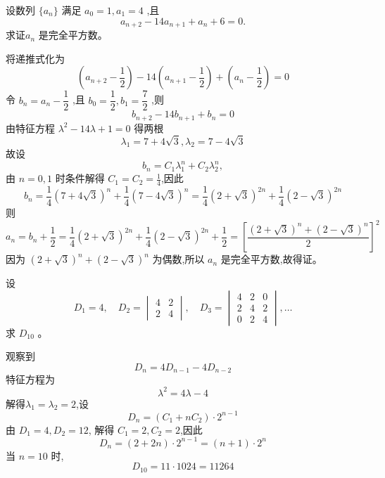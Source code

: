 \begin{questions}
    \question 设数列 $\{a_n\}$ 满足 $a_0 = 1, a_1 = 4$ ,且 
    \[
    a_{n+2} - 14a_{n+1} + a_n + 6 = 0.
    \]
    求证$a_n$ 是完全平方数。
    \begin{solution}
        将递推式化为 
        \[
        \left(a_{n+2} - \frac{1}{2}\right) - 14\left(a_{n+1} - \frac{1}{2}\right) + \left(a_n - \frac{1}{2}\right) = 0
        \]
        令 $b_n = a_n - \dfrac{1}{2}$ ,且 $b_0 = \dfrac{1}{2}, b_1 = \dfrac{7}{2}$ ,则 
        \[
        b_{n+2} - 14b_{n+1} + b_n = 0
        \]
        由特征方程 $\lambda^2 - 14\lambda + 1 = 0$ 得两根 
        \[
        \lambda_1 = 7+4\sqrt{3}, \lambda_2 = 7-4\sqrt{3}
        \]
        故设
        \[
        b_n = C_1 \lambda_1^n + C_2 \lambda_2^n ,
        \]
        由 $n=0, 1$ 时条件解得 $C_1 = C_2 = \frac{1}{4}$,因此 
        \[
        b_n = \frac{1}{4}(7+4\sqrt{3})^n + \frac{1}{4}(7-4\sqrt{3})^n = \frac{1}{4}(2+\sqrt{3})^{2n} + \frac{1}{4}(2-\sqrt{3})^{2n}
        \]
        则 
        \[
        a_n = b_n + \frac{1}{2} = \frac{1}{4}(2+\sqrt{3})^{2n} + \frac{1}{4}(2-\sqrt{3})^{2n} + \frac{1}{2} = \left[ \frac{(2+\sqrt{3})^n + (2-\sqrt{3})^n}{2} \right]^2
        \]
        因为 $(2+\sqrt{3})^n + (2-\sqrt{3})^n$ 为偶数,所以 $a_n$ 是完全平方数,故得证。
    \end{solution}

    \question 设
    \[
    D_1 = 4,\quad D_2 = \begin{vmatrix} 4 & 2 \\ 2 & 4 \end{vmatrix},\quad D_3 = \begin{vmatrix} 4 & 2 & 0 \\ 2 & 4 & 2 \\ 0 & 2 & 4 \end{vmatrix}, \dots 
    \]
    求 $D_{10}$ 。
    \begin{solution}
        观察到
        \[
        D_n = 4D_{n-1} - 4D_{n-2}
        \]
        特征方程为
        \[
        \lambda^2 = 4\lambda - 4 
        \]
        解得$\lambda_1 = \lambda_2 = 2$,设 
        \[
        D_n = (C_1 + nC_2) \cdot 2^{n-1}
        \]
        由 $D_1 = 4, D_2 = 12$, 解得 $C_1 = 2, C_2 = 2$,因此 
        \[
        D_n = (2 + 2n) \cdot 2^{n-1} = (n+1) \cdot 2^n
        \]
        当 $n=10$ 时,
        \[
        D_{10} = 11 \cdot 1024 = 11264
        \]
    \end{solution}


\end{questions}
